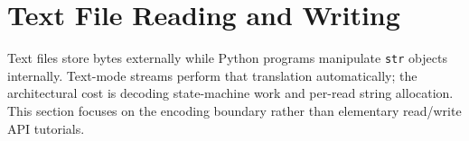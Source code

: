 \section{Text File Reading and Writing}

Text files store bytes externally while Python programs manipulate \texttt{str} objects internally. Text-mode streams perform that translation automatically; the architectural cost is decoding state-machine work and per-read string allocation. This section focuses on the encoding boundary rather than elementary read/write API tutorials.
